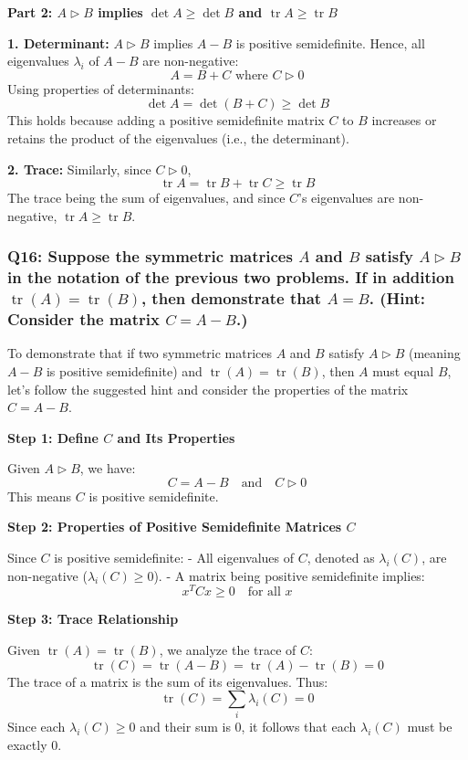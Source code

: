 \documentclass[8pt]{article}
\begin{document}
{\textbf{Part 2: \(A \triangleright B\) implies \(\det A \geq \det B\) and \(\operatorname{tr} A \geq \operatorname{tr} B\)}

\textbf{1. Determinant:}
   \(A \triangleright B\) implies \(A - B\) is positive semidefinite. Hence, all eigenvalues \(\lambda_i\) of \(A - B\) are non-negative:
   \[
   A = B + C \text{ where } C \triangleright 0
   \]
   Using properties of determinants:
   \[
   \det A = \det (B + C) \geq \det B
   \]
   This holds because adding a positive semidefinite matrix \(C\) to \(B\) increases or retains the product of the eigenvalues (i.e., the determinant).

\textbf{2. Trace:}
   Similarly, since \(C \triangleright 0\),
   \[
   \operatorname{tr} A = \operatorname{tr} B + \operatorname{tr} C \geq \operatorname{tr} B
   \]
   The trace being the sum of eigenvalues, and since \(C\)'s eigenvalues are non-negative, \(\operatorname{tr} A \geq \operatorname{tr} B\).


\subsubsection*{Q16: Suppose the symmetric matrices \(A\) and \(B\) satisfy \(A \triangleright B\) in the notation of the previous two problems. If in addition \(\operatorname{tr} (A) = \operatorname{tr} (B)\), then demonstrate that \(A = B\). (Hint: Consider the matrix \(C = A - B\).)}

To demonstrate that if two symmetric matrices \(A\) and \(B\) satisfy \(A \triangleright B\) (meaning \(A - B\) is positive semidefinite) and \(\operatorname{tr}(A) = \operatorname{tr}(B)\), then \(A\) must equal \(B\), let's follow the suggested hint and consider the properties of the matrix \(C = A - B\).

\textbf{Step 1: Define \(C\) and Its Properties}

Given \(A \triangleright B\), we have:
\[
C = A - B \quad \text{and} \quad C \triangleright 0
\]
This means \(C\) is positive semidefinite.

\textbf{Step 2: Properties of Positive Semidefinite Matrices \(C\)}

Since \(C\) is positive semidefinite:
- All eigenvalues of \(C\), denoted as \(\lambda_i(C)\), are non-negative (\(\lambda_i(C) \geq 0\)).
- A matrix being positive semidefinite implies:
  \[
  x^T C x \geq 0 \quad \text{for all } x
  \]

\textbf{Step 3: Trace Relationship}

Given \(\operatorname{tr}(A) = \operatorname{tr}(B)\), we analyze the trace of \(C\):
\[
\operatorname{tr}(C) = \operatorname{tr}(A - B) = \operatorname{tr}(A) - \operatorname{tr}(B) = 0
\]
The trace of a matrix is the sum of its eigenvalues. Thus:
\[
\operatorname{tr}(C) = \sum_i \lambda_i(C) = 0
\]
Since each \(\lambda_i(C) \geq 0\) and their sum is 0, it follows that each \(\lambda_i(C)\) must be exactly 0.

}
\end{document}

